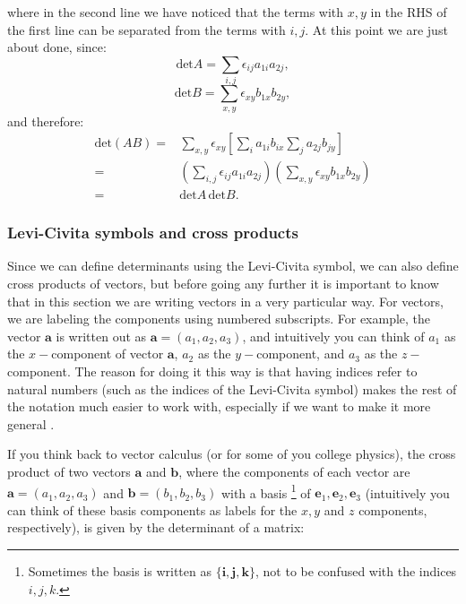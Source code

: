 where in the second line we have noticed that the terms with $x,y$ in the RHS of the first line can be separated from the terms with $i,j$.
At this point we are just about done, since:
\[
\text{det}A=\sum_{i,j} \epsilon_{ij} a_{1i}a_{2j},
\]
\[
\text{det}B=\sum_{x,y} \epsilon_{xy} b_{1x}b_{2y},
\]
and therefore:
\begin{align*}
\text{det}(AB)=& \sum_{x,y} \epsilon_{xy} \left[ \sum_i a_{1i}b_{ix} \sum_j a_{2j}b_{jy}\right]\\
=&  \left(\sum_{i,j}\epsilon_{ij}   a_{1i}a_{2j}\right)\left(\sum_{x,y}  \epsilon_{xy} b_{1x}b_{2y}\right)\\
=& \text{det}A \,\text{det}B.
\end{align*}




\subsubsection*{Levi-Civita symbols and cross products}
Since we can define determinants using the Levi-Civita symbol, we can also define cross products of vectors, but before going any further it is important to know that in this section we are writing vectors in a very particular way.  For vectors, we are labeling the components using numbered subscripts.  For example, the vector $\textbf{a}$ is written out as $\textbf{a}=(a_1, a_2, a_3)$, and intuitively you can think of $a_1$ as the $x-$component of vector $\textbf{a}$, $a_2$ as the $y-$component, and $a_3$ as the $z-$component.  The reason for doing it this way is that having indices refer to natural numbers (such as the indices of the Levi-Civita symbol) makes the rest of the notation much easier to work with, especially if we want to make it more general .   

If you think back to vector calculus (or for some of you college physics), the cross product of two vectors $\textbf{a}$ and $\textbf{b}$, where the components of each vector are $\textbf{a}=(a_1, a_2, a_3)$ and $\textbf{b}=(b_1, b_2, b_3)$ with a basis \footnote{Sometimes the basis is written as $\{ \textbf{i}, \textbf{j},\textbf{k} \}$, not to be confused with the indices $i,j,k$.} of $\textbf{e}_1, \textbf{e}_2, \textbf{e}_3$ (intuitively you can think of these basis components as labels for the $x,y$ and $z$ components, respectively), is given by the determinant of a matrix:

